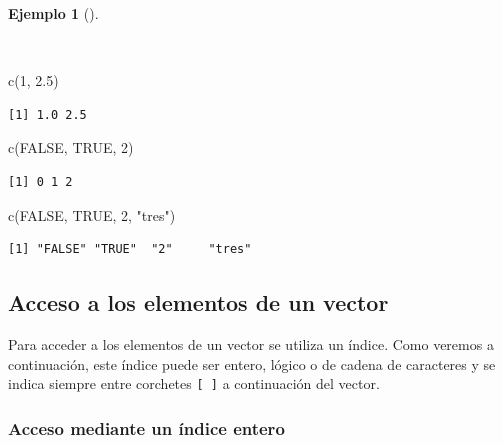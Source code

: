 \documentclass[
  spanish,
  a4paper,
]{scrreport}
\newenvironment{Shaded}{\begin{snugshade}}{\end{snugshade}}
\newcommand{\ConstantTok}[1]{\textcolor[rgb]{0.56,0.35,0.01}{#1}}
\newcommand{\DecValTok}[1]{\textcolor[rgb]{0.68,0.00,0.00}{#1}}
\newcommand{\FloatTok}[1]{\textcolor[rgb]{0.68,0.00,0.00}{#1}}
\newcommand{\FunctionTok}[1]{\textcolor[rgb]{0.28,0.35,0.67}{#1}}
\newcommand{\NormalTok}[1]{\textcolor[rgb]{0.00,0.23,0.31}{#1}}
\newcommand{\StringTok}[1]{\textcolor[rgb]{0.13,0.47,0.30}{#1}}
\theoremstyle{definition}
\theoremstyle{definition}
\newtheorem{example}{Ejemplo}[chapter]
\theoremstyle{remark}
\begin{document}
\begin{example}[]\protect\hypertarget{exm-coercion}{}\label{exm-coercion}

~

\begin{Shaded}
\begin{Highlighting}[]
\FunctionTok{c}\NormalTok{(}\DecValTok{1}\NormalTok{, }\FloatTok{2.5}\NormalTok{)}
\end{Highlighting}
\end{Shaded}

\begin{verbatim}
[1] 1.0 2.5
\end{verbatim}

\begin{Shaded}
\begin{Highlighting}[]
\FunctionTok{c}\NormalTok{(}\ConstantTok{FALSE}\NormalTok{, }\ConstantTok{TRUE}\NormalTok{, }\DecValTok{2}\NormalTok{)}
\end{Highlighting}
\end{Shaded}

\begin{verbatim}
[1] 0 1 2
\end{verbatim}

\begin{Shaded}
\begin{Highlighting}[]
\FunctionTok{c}\NormalTok{(}\ConstantTok{FALSE}\NormalTok{, }\ConstantTok{TRUE}\NormalTok{, }\DecValTok{2}\NormalTok{, }\StringTok{"tres"}\NormalTok{)}
\end{Highlighting}
\end{Shaded}

\begin{verbatim}
[1] "FALSE" "TRUE"  "2"     "tres" 
\end{verbatim}

\end{example}

\subsection{Acceso a los elementos de un
vector}\label{acceso-a-los-elementos-de-un-vector}

Para acceder a los elementos de un vector se utiliza un índice. Como
veremos a continuación, este índice puede ser entero, lógico o de cadena
de caracteres y se indica siempre entre corchetes \texttt{{[}\ {]}} a
continuación del vector.

\subsubsection{Acceso mediante un índice
entero}\label{acceso-mediante-un-uxedndice-entero}
\end{document}
